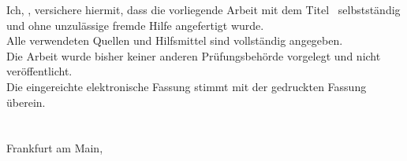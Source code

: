 \begin{declaration}
	\addchaptertocentry{\authorshipname} %
	Ich, \mbox{\authorname}, versichere hiermit, dass die vorliegende Arbeit mit dem Titel \linebreak\glqq\textbf{\ttitle}\grqq~selbstst\"andig und ohne unzul\"assige fremde Hilfe angefertigt wurde.
	\\
	
	Alle verwendeten Quellen und Hilfsmittel sind vollst\"andig angegeben.
	\\
	
	Die Arbeit wurde bisher keiner anderen Pr\"ufungsbeh\"orde vorgelegt und nicht ver\"offentlicht.
	\\
	
	Die eingereichte elektronische Fassung stimmt mit der gedruckten Fassung \"uberein.
	\\[1cm]
	
	\noindent \authorname \\ \\
	\noindent Frankfurt am Main, \submissiondate\\
\end{declaration}





